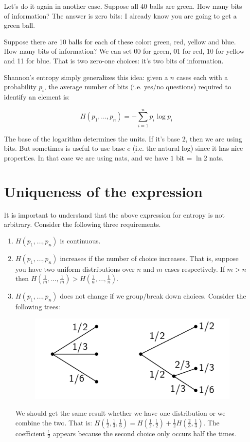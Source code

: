 \documentclass[aps,pra,10pt,floatfix,nofootinbib]{revtex4-1}
\theoremstyle{definition}
\begin{document}
Let's do it again in another case. Suppose all 40 balls are green. How many bits of information? The answer is zero bits: I already know you are going to get a green ball.

Suppose there are 10 balls for each of these color: green, red, yellow and blue. How many bits of information? We can set 00 for green, 01 for red, 10 for yellow and 11 for blue. That is two zero-one choices: it's two bits of information.

Shannon's entropy simply generalizes this idea: given a $n$ cases each with a probability $p_i$, the average number of bits (i.e. yes/no questions) required to identify an element is:

\begin{equation}
\label{ShannonEntropy}
H(p_1, ..., p_n) = - \sum_{i=1}^{n} p_i \log p_i
\end{equation}

The base of the logarithm determines the units. If it's base $2$, then we are using bits. But sometimes is useful to use base $e$ (i.e. the natural log) since it has nice properties. In that case we are using nats, and we have $1$ bit = $\ln 2$ nats.

\section{Uniqueness of the expression}

It is important to understand that the above expression for entropy is not arbitrary. Consider the following three requirements.

\begin{enumerate}
	\item $H(p_1, ..., p_n)$ is continuous.
	\item $H(p_1, ..., p_n)$ increases if the number of choice increases. That is, suppose you have two uniform distributions over $n$ and $m$ cases respectively. If $m>n$ then $H(\frac{1}{m}, ..., \frac{1}{m})>H(\frac{1}{n}, ..., \frac{1}{n})$.
	\item $H(p_1, ..., p_n)$ does not change if we group/break down choices. Consider the following trees:
	\begin{figure}[h]
	\includegraphics[scale=0.50]{ShannonTree}
	\centering
	\end{figure}
	
	We should get the same result whether we have one distribution or we combine the two. That is: $H(\frac{1}{2}, \frac{1}{3}, \frac{1}{6}) = H(\frac{1}{2},\frac{1}{2}) + \frac{1}{2} H(\frac{2}{3}, \frac{1}{3})$. The coefficient $\frac{1}{2}$ appears because the second choice only occurs half the times.
\end{enumerate}
\end{document}
